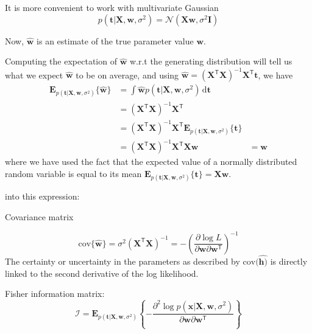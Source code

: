 \documentclass[a4paper,11pt]{article} %
\begin{document}
It is more convenient to work with multivariate Gaussian
\begin{equation}
p(\mathbf{t}|\mathbf{X},\mathbf{w},\sigma^2) = \mathcal{N}(\mathbf{X}\mathbf{w},\sigma^2\mathbf{I})
\end{equation}

Now, $\widehat{\mathbf{w}}$ is an estimate of the true parameter value $\mathbf{w}$.

Computing the expectation of $\widehat{\mathbf{w}}$ w.r.t the generating distribution will tell us
what we expect $\widehat{\mathbf{w}}$ to be on average, and using
$\widehat{\mathbf{w}} = (\mathbf{X}^{\mathsf{T}}\mathbf{X})^{-1}\mathbf{X}^{\mathsf{T}}\mathbf{t}$,
we have
\begin{align*}
\mathbf{E}_{p(\mathbf{t}|\mathbf{X},\mathbf{w},\sigma^2)}\{\widehat{\mathbf{w}}\} & =
\int \widehat{\mathbf{w}} p(\mathbf{t}|\mathbf{X},\mathbf{w},\sigma^2)\,\mathrm{d}\mathbf{t} \\
& = (\mathbf{X}^{\mathsf{T}}\mathbf{X})^{-1}\mathbf{X}^{\mathsf{T}} \\
& = (\mathbf{X}^{\mathsf{T}}\mathbf{X})^{-1}\mathbf{X}^{\mathsf{T}} 
\mathbf{E}_{p(\mathbf{t}|\mathbf{X},\mathbf{w},\sigma^2)}\{\mathbf{t}\} \\
& = (\mathbf{X}^{\mathsf{T}}\mathbf{X})^{-1}\mathbf{X}^{\mathsf{T}}\mathbf{X}\mathbf{w}
& = \mathbf{w}
\end{align*}
where we have used the fact that the expected value of a normally distributed random
variable is equal to its mean
$\mathbf{E}_{p(\mathbf{t}|\mathbf{X},\mathbf{w},\sigma^2)}\{\mathbf{t}\} =
\mathbf{X}\mathbf{w}$.


into this expression:


Covariance matrix

\begin{equation}
\mathrm{cov}\{\widehat{\mathbf{w}}\} = \sigma^2 (\mathbf{X}^{\mathsf{T}}\mathbf{X})^{-1} =
-\left( \frac{\partial\log L}{\partial\mathbf{w}\partial\mathbf{w}^{\mathsf{T}}} \right)^{-1}
\end{equation}
The certainty or uncertainty in the parameters as described by $\mathrm{cov}(\widehat{\mathbf{h})}$
is directly linked to the second derivative of the log likelihood.

Fisher information matrix:
\begin{equation}
\mathcal{I} = \mathbf{E}_{p(\mathbf{t}|\mathbf{X},\mathbf{w},\sigma^2)}
\left\{ -\frac{\partial^2\log p(\mathbf{x}|\mathbf{X},\mathbf{w},\sigma^2)}{\partial\mathbf{w}\partial\mathbf{w}^{\mathsf{T}}}
\right\}
\end{equation}
\end{document}
